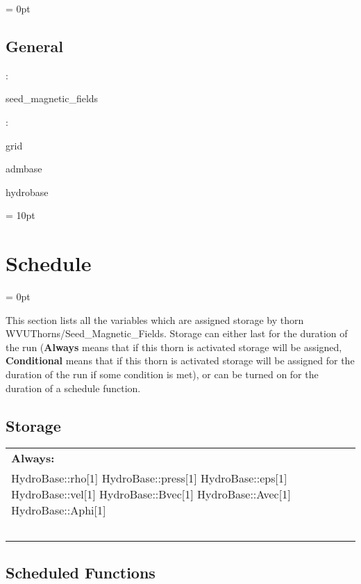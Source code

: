 \documentclass{article}
\begin{document}
\parskip = 0pt

\vspace{3mm} \subsection*{General}

: 

seed\_magnetic\_fields
\vspace{2mm}

: 

grid

admbase

hydrobase
\vspace{2mm}

\vspace{5mm}\parskip = 10pt 

\section{Schedule} 


\parskip = 0pt


\noindent This section lists all the variables which are assigned storage by thorn WVUThorns/Seed\_Magnetic\_Fields.  Storage can either last for the duration of the run ({\bf Always} means that if this thorn is activated storage will be assigned, {\bf Conditional} means that if this thorn is activated storage will be assigned for the duration of the run if some condition is met), or can be turned on for the duration of a schedule function.


\subsection*{Storage}

\hspace{5mm}

 \begin{tabular*}{160mm}{ll} 

{\bf Always:}&  ~ \\ 
 HydroBase::rho[1] HydroBase::press[1] HydroBase::eps[1] HydroBase::vel[1] HydroBase::Bvec[1] HydroBase::Avec[1] HydroBase::Aphi[1] & ~\\ 
~ & ~\\ 
\end{tabular*} 


\subsection*{Scheduled Functions}
\vspace{5mm}
\end{document}
